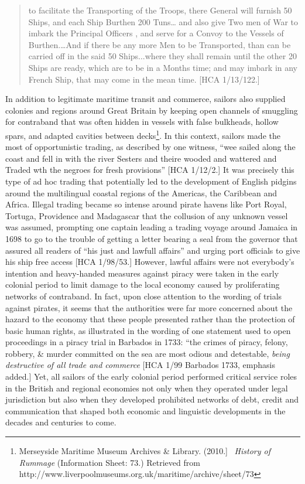 \begin{quotation}
to facilitate the Transporting of the Troops, there General will furnish 50 Ships, and each Ship Burthen 200 Tuns… and also give Two men of War to imbark the Principal Officers , and serve for a Convoy to the Vessels of Burthen.…And if there be any more Men to be Transported, than can be carried off in the said 50 Ships...where they shall remain until the other 20 Ships are ready, which are to be in a Months time; and may imbark in any French Ship, that may come in the mean time. [HCA 1/13/122.]

\end{quotation}
\begin{styleStandard}
In addition to legitimate maritime transit and commerce, sailors also supplied colonies and regions around Great Britain by keeping open channels of smuggling for contraband that was often hidden in vessels with false bulkheads, hollow spars, and adapted cavities between decks\footnote{ Merseyside Maritime Museum Archives \& Library. (2010.] \ \textit{History of Rummage} (Information Sheet: 73.) Retrieved from http://www.liverpoolmuseums.org.uk/maritime/archive/sheet/73}. In this context, sailors made the most of opportunistic trading, as described by one witness, “wee sailed along the coast and fell in with the river Sesters and theire wooded and wattered and Traded wth the negroes for fresh provisions” [HCA 1/12/2.] It was precisely this type of ad hoc trading that potentially led to the development of English pidgins around the multilingual coastal regions of the Americas, the Caribbean and Africa. Illegal trading became so intense around pirate havens like Port Royal, Tortuga, Providence and Madagascar that the collusion of any unknown vessel was assumed, prompting one captain leading a trading voyage around Jamaica in 1698 to go to the trouble of getting a letter bearing a seal from the governor that assured all readers of “his just and lawfull affairs” and urging port officials to give his ship free access [HCA 1/98/53.] However, lawful affairs were not everybody’s intention and heavy-handed measures against piracy were taken in the early colonial period to limit damage to the local economy caused by proliferating networks of contraband. In fact, upon close attention to the wording of trials against pirates, it seems that the authorities were far more concerned about the hazard to the economy that these people presented rather than the protection of basic human rights, as illustrated in the wording of one statement used to open proceedings in a piracy trial in Barbados in 1733: “the crimes of piracy, felony, robbery, \& murder committed on the sea are most odious and detestable, \textit{being destructive of all trade and commerce}{\textquotedbl} [HCA 1/99 Barbados 1733, emphasis added.] Yet, all sailors of the early colonial period performed critical service roles in the British and regional economies not only when they operated under legal jurisdiction but also when they developed prohibited networks of debt, credit and communication that shaped both economic and linguistic developments in the decades and centuries to come. 
\end{styleStandard}


